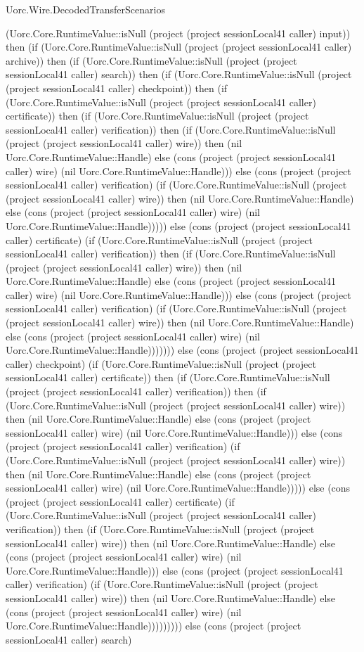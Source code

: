 \begin{lexlean}{Uorc.Wire.DecodedTransferScenarios}
\begin{semanticmodule}
{(Uorc.Core.RuntimeValue::isNull (project (project sessionLocal41 caller) input)) then (if (Uorc.Core.RuntimeValue::isNull (project (project sessionLocal41 caller) archive)) then (if (Uorc.Core.RuntimeValue::isNull (project (project sessionLocal41 caller) search)) then (if (Uorc.Core.RuntimeValue::isNull (project (project sessionLocal41 caller) checkpoint)) then (if (Uorc.Core.RuntimeValue::isNull (project (project sessionLocal41 caller) certificate)) then (if (Uorc.Core.RuntimeValue::isNull (project (project sessionLocal41 caller) verification)) then (if (Uorc.Core.RuntimeValue::isNull (project (project sessionLocal41 caller) wire)) then (nil Uorc.Core.RuntimeValue::Handle) else (cons (project (project sessionLocal41 caller) wire) (nil Uorc.Core.RuntimeValue::Handle))) else (cons (project (project sessionLocal41 caller) verification) (if (Uorc.Core.RuntimeValue::isNull (project (project sessionLocal41 caller) wire)) then (nil Uorc.Core.RuntimeValue::Handle) else (cons (project (project sessionLocal41 caller) wire) (nil Uorc.Core.RuntimeValue::Handle))))) else (cons (project (project sessionLocal41 caller) certificate) (if (Uorc.Core.RuntimeValue::isNull (project (project sessionLocal41 caller) verification)) then (if (Uorc.Core.RuntimeValue::isNull (project (project sessionLocal41 caller) wire)) then (nil Uorc.Core.RuntimeValue::Handle) else (cons (project (project sessionLocal41 caller) wire) (nil Uorc.Core.RuntimeValue::Handle))) else (cons (project (project sessionLocal41 caller) verification) (if (Uorc.Core.RuntimeValue::isNull (project (project sessionLocal41 caller) wire)) then (nil Uorc.Core.RuntimeValue::Handle) else (cons (project (project sessionLocal41 caller) wire) (nil Uorc.Core.RuntimeValue::Handle))))))) else (cons (project (project sessionLocal41 caller) checkpoint) (if (Uorc.Core.RuntimeValue::isNull (project (project sessionLocal41 caller) certificate)) then (if (Uorc.Core.RuntimeValue::isNull (project (project sessionLocal41 caller) verification)) then (if (Uorc.Core.RuntimeValue::isNull (project (project sessionLocal41 caller) wire)) then (nil Uorc.Core.RuntimeValue::Handle) else (cons (project (project sessionLocal41 caller) wire) (nil Uorc.Core.RuntimeValue::Handle))) else (cons (project (project sessionLocal41 caller) verification) (if (Uorc.Core.RuntimeValue::isNull (project (project sessionLocal41 caller) wire)) then (nil Uorc.Core.RuntimeValue::Handle) else (cons (project (project sessionLocal41 caller) wire) (nil Uorc.Core.RuntimeValue::Handle))))) else (cons (project (project sessionLocal41 caller) certificate) (if (Uorc.Core.RuntimeValue::isNull (project (project sessionLocal41 caller) verification)) then (if (Uorc.Core.RuntimeValue::isNull (project (project sessionLocal41 caller) wire)) then (nil Uorc.Core.RuntimeValue::Handle) else (cons (project (project sessionLocal41 caller) wire) (nil Uorc.Core.RuntimeValue::Handle))) else (cons (project (project sessionLocal41 caller) verification) (if (Uorc.Core.RuntimeValue::isNull (project (project sessionLocal41 caller) wire)) then (nil Uorc.Core.RuntimeValue::Handle) else (cons (project (project sessionLocal41 caller) wire) (nil Uorc.Core.RuntimeValue::Handle))))))))) else (cons (project (project sessionLocal41 caller) search) }
\end{semanticmodule}
\end{lexlean}
